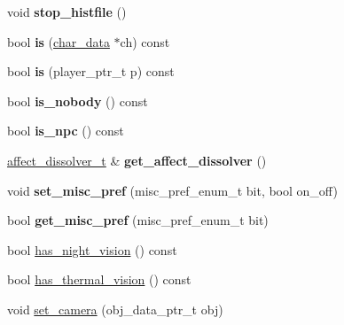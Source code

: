\begin{DoxyCompactItemize}
\item 
\mbox{\label{classmods_1_1player_a39bb8831e0f6f05988041f270fa99522}} 
void {\bfseries stop\+\_\+histfile} ()
\item 
\mbox{\label{classmods_1_1player_a9a30e134073f21fc5bf5b60425e93028}} 
bool {\bfseries is} (\hyperlink{structchar__data}{char\+\_\+data} $\ast$ch) const
\item 
\mbox{\label{classmods_1_1player_a44c0e06e4d068226a8fc1c8fc315c259}} 
bool {\bfseries is} (player\+\_\+ptr\+\_\+t p) const
\item 
\mbox{\label{classmods_1_1player_a854ea69ac76dee8f93e3c0b2b1e6512d}} 
bool {\bfseries is\+\_\+nobody} () const
\item 
\mbox{\label{classmods_1_1player_aba76379ca29fd4b79a99843106b2bc43}} 
bool {\bfseries is\+\_\+npc} () const
\item 
\mbox{\label{classmods_1_1player_a9f6a8b1a9339eadb2836d56700f743d7}} 
\hyperlink{structmods_1_1affects_1_1dissolver}{affect\+\_\+dissolver\+\_\+t} \& {\bfseries get\+\_\+affect\+\_\+dissolver} ()
\item 
\mbox{\label{classmods_1_1player_ac3f7da3737790ce82db3f97a35e175a6}} 
void {\bfseries set\+\_\+misc\+\_\+pref} (misc\+\_\+pref\+\_\+enum\+\_\+t bit, bool on\+\_\+off)
\item 
\mbox{\label{classmods_1_1player_ad8524b2a600811e694c4cc1892ee8451}} 
bool {\bfseries get\+\_\+misc\+\_\+pref} (misc\+\_\+pref\+\_\+enum\+\_\+t bit)
\item 
bool \hyperlink{classmods_1_1player_a9631c9d8b2bccdf598d84756fac2aeb9}{has\+\_\+night\+\_\+vision} () const
\item 
bool \hyperlink{classmods_1_1player_a0fceca22b6757b46d3b31c22acc3c690}{has\+\_\+thermal\+\_\+vision} () const
\item 
void \hyperlink{classmods_1_1player_aec46cbc02ebe8769c4c831510acafce3}{set\+\_\+camera} (obj\+\_\+data\+\_\+ptr\+\_\+t obj)
\item 
\mbox{\label{classmods_1_1player_a7b639adaff3e21cceec7b9ebf39b6e90}} 

\end{DoxyCompactItemize}
